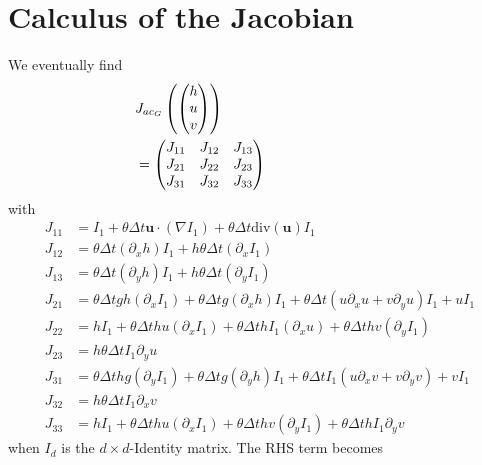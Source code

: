 \documentclass[a4paper, 11pt]{article}
\begin{document}
\section{Calculus of the Jacobian}
We eventually find
\begin{equation*}
\begin{split}
&\hspace*{-3cm}J_{ac_G}\left(\begin{pmatrix}h\\u\\v\end{pmatrix}\right)\\&\hspace*{-3cm}=
\begin{pmatrix}
J_{11} & J_{12} & J_{13} \\
J_{21}& J_{22}& J_{23}\\
J_{31}& J_{32}& J_{33}
\end{pmatrix}
\end{split}
\end{equation*}
with 
\begin{align*}
J_{11} &= I_1+\theta\Delta t\boldsymbol{u}\cdot\left(\nabla I_1\right)+\theta\Delta t\text{div}\left(\boldsymbol{u}\right)I_1 \\
J_{12} & =\theta\Delta t(\partial_xh)I_1+h\theta\Delta t(\partial_xI_1) \\
J_{13} & =\theta\Delta t(\partial_yh)I_1+h\theta\Delta t(\partial_yI_1)\\
J_{21} &= \theta\Delta tgh(\partial_xI_1)+\theta\Delta tg\left(\partial_xh\right)I_1+\theta\Delta t\left(u\partial_xu+v\partial_yu\right)I_1+uI_1 \\
J_{22} &= hI_1+\theta\Delta thu(\partial_xI_1)+\theta\Delta thI_1(\partial_xu)+\theta\Delta thv(\partial_yI_1)\\
J_{23} &= h\theta\Delta tI_1\partial_y u\\
J_{31} &= \theta\Delta thg(\partial_yI_1)+\theta\Delta tg\left(\partial_yh\right)I_1+\theta\Delta tI_1(u\partial_xv+v\partial_yv)+vI_1\\
J_{32} &= h\theta\Delta tI_1\partial_x v \\
J_{33} &= hI_1+\theta\Delta thu(\partial_xI_1)+\theta\Delta thv(\partial_yI_1)+\theta\Delta thI_1\partial_yv
\end{align*}
when $I_d$ is the $d\times d$-Identity matrix.
The RHS term becomes
\end{document}
